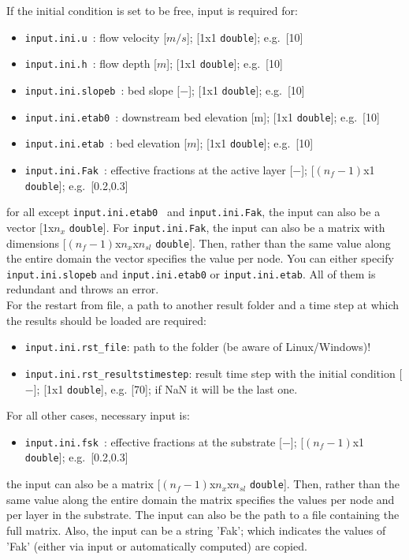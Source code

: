 \documentclass[a4paper, 11pt]{article}
\begin{document}
If the initial condition is set to be free, input is required for:
\begin{itemize}
\item \texttt{input.ini.u      }: flow velocity [$m/s$]; [1x1 \texttt{double}]; e.g.\ [10]
\item \texttt{input.ini.h      }: flow depth [$m$]; [1x1 \texttt{double}]; e.g.\ [10]
\item \texttt{input.ini.slopeb }: bed slope [$-$]; [1x1 \texttt{double}]; e.g.\ [10]
\item \texttt{input.ini.etab0  }: downstream bed elevation [m]; [1x1 \texttt{double}]; e.g.\ [10]
\item \texttt{input.ini.etab   }: bed elevation [$m$]; [1x1 \texttt{double}]; e.g.\ [10]
\item \texttt{input.ini.Fak    }: effective fractions at the active layer [$-$]; [$(n_f-1)$x1 \texttt{double}]; e.g.\ [0.2,0.3]
\end{itemize}
for all except \texttt{input.ini.etab0  } and \texttt{input.ini.Fak}, the input can also be a vector [1x$n_x$ \texttt{double}]. For \texttt{input.ini.Fak}, the input can also be a matrix with dimensions [$(n_f-1)$x$n_x$x$n_{sl}$ \texttt{double}]. Then, rather than the same value along the entire domain the vector specifies the value per node. 
You can either specify \texttt{input.ini.slopeb} and \texttt{input.ini.etab0} or \texttt{input.ini.etab}. All of them is redundant and throws an error.\\

For the restart from file, a path to another result folder and a time step at which the results should be loaded are required:
\begin{itemize}
\item \texttt{input.ini.rst\_file}: path to the folder (be aware of Linux/Windows)!
\item \texttt{input.ini.rst\_resultstimestep}: result time step with the initial condition [$-$]; [1x1 \texttt{double}], e.g. [70]; if NaN it will be the last one.     
\end{itemize}

For all other cases, necessary input is:
\begin{itemize}
\item \texttt{input.ini.fsk    }: effective fractions at the substrate [$-$]; [$(n_f-1)$x1 \texttt{double}]; e.g.\ [0.2,0.3]
\end{itemize}
the input can also be a matrix [$(n_f-1)$x$n_x$x$n_{sl}$ \texttt{double}]. Then, rather than the same value along the entire domain the matrix specifies the values per node and per layer in the substrate. The input can also be the path to a file containing the full matrix. Also, the input can be a string 'Fak'; which indicates the values of 'Fak' (either via input or automatically computed) are copied.\\
\end{document}
